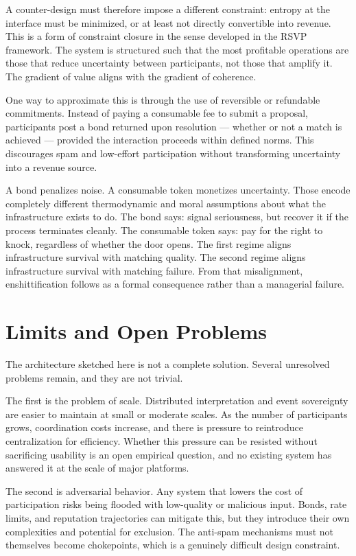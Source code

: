 \documentclass[12pt, a4paper]{article}
\begin{document}
A counter-design must therefore impose a different constraint: entropy at the
interface must be minimized, or at least not directly convertible into revenue.
This is a form of constraint closure in the sense developed in the RSVP
framework. The system is structured such that the most profitable operations
are those that reduce uncertainty between participants, not those that amplify
it. The gradient of value aligns with the gradient of coherence.

One way to approximate this is through the use of reversible or refundable
commitments. Instead of paying a consumable fee to submit a proposal,
participants post a bond returned upon resolution --- whether or not a match
is achieved --- provided the interaction proceeds within defined norms.
This discourages spam and low-effort participation without transforming
uncertainty into a revenue source.

A bond penalizes noise. A consumable token monetizes uncertainty. Those encode
completely different thermodynamic and moral assumptions about what the
infrastructure exists to do. The bond says: signal seriousness, but recover
it if the process terminates cleanly. The consumable token says: pay for the
right to knock, regardless of whether the door opens. The first regime aligns
infrastructure survival with matching quality. The second regime aligns
infrastructure survival with matching failure. From that misalignment,
enshittification follows as a formal consequence rather than a managerial
failure.

\section{Limits and Open Problems}

The architecture sketched here is not a complete solution. Several unresolved
problems remain, and they are not trivial.

The first is the problem of scale. Distributed interpretation and event
sovereignty are easier to maintain at small or moderate scales. As the number
of participants grows, coordination costs increase, and there is pressure to
reintroduce centralization for efficiency. Whether this pressure can be resisted
without sacrificing usability is an open empirical question, and no existing
system has answered it at the scale of major platforms.

The second is adversarial behavior. Any system that lowers the cost of
participation risks being flooded with low-quality or malicious input. Bonds,
rate limits, and reputation trajectories can mitigate this, but they introduce
their own complexities and potential for exclusion. The anti-spam mechanisms
must not themselves become chokepoints, which is a genuinely difficult design
constraint.
\end{document}
